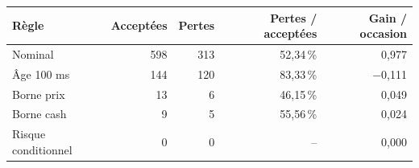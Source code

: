 \begin{tabularx}{\linewidth}{@{}Yrrrr@{}}
\toprule
Règle & Acceptées & Pertes & Pertes / acceptées & Gain / occasion\\
\midrule
Nominal & 598 & 313 & 52,34\,\% & 0,977\\
Âge 100 ms & 144 & 120 & 83,33\,\% & \ensuremath{-}0,111\\
Borne prix & 13 & 6 & 46,15\,\% & 0,049\\
Borne cash & 9 & 5 & 55,56\,\% & 0,024\\
Risque conditionnel & 0 & 0 & -- & 0,000\\
\bottomrule
\end{tabularx}